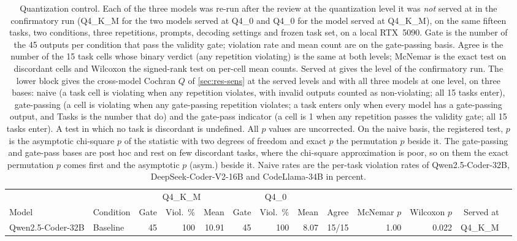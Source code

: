 \begin{table}[t]
\caption{Quantization control. Each of the three models was re-run after the review at
the quantization level it was \emph{not} served at in the confirmatory run (Q4\_K\_M for
the two models served at Q4\_0 and Q4\_0 for the model served at Q4\_K\_M), on the same
fifteen tasks, two conditions, three repetitions, prompts, decoding settings and frozen
task set, on a local RTX~5090. Gate is the number of the 45 outputs per condition that
pass the validity gate; violation rate and mean count are on the gate-passing basis.
Agree is the number of the 15 task cells whose binary verdict (any repetition violating)
is the same at both levels; McNemar is the exact test on discordant cells and Wilcoxon
the signed-rank test on per-cell mean counts. Served at gives the level of the
confirmatory run. The lower block gives the cross-model Cochran $Q$ of \ref{sec:res-sens}
at the served levels and with all three models at one level, on three bases: naive (a
task cell is violating when any repetition violates, with invalid outputs counted as
non-violating; all 15 tasks enter), gate-passing (a cell is violating when any
gate-passing repetition violates; a task enters only when every model has a gate-passing
output, and Tasks is the number that do) and the gate-pass indicator (a cell is 1 when any
repetition passes the validity gate; all 15 tasks enter). A test in which no task is
discordant is undefined. All $p$ values are uncorrected. On the naive basis, the registered test, $p$ is the asymptotic chi-square $p$ of the statistic with two degrees of freedom and exact $p$ the permutation $p$ beside it. The gate-passing and gate-pass bases are post hoc and rest on few discordant tasks, where the chi-square approximation is poor, so on them the exact permutation $p$ comes first and the asymptotic $p$ (asym.) beside it. Naive rates are the per-task violation rates of
Qwen2.5-Coder-32B, DeepSeek-Coder-V2-16B and CodeLlama-34B in percent.}
\label{tab:quant}
\centering
\footnotesize
\setlength{\tabcolsep}{2.7pt}
\begin{tabular}{@{}llrrrrrrrrrrr@{}}
\toprule
 & & \multicolumn{3}{c}{Q4\_K\_M} & \multicolumn{3}{c}{Q4\_0} & & & & & \\
\cmidrule(lr){3-5}\cmidrule(lr){6-8}
Model & Condition & Gate & Viol.\ \% & Mean & Gate & Viol.\ \% & Mean & Agree & McNemar $p$ & Wilcoxon $p$ & Served at & \\
\midrule
Qwen2.5-Coder-32B & Baseline & 45 & 100 & 10.91 & 45 & 100 & 8.07 & 15/15 & 1.00 & 0.022 & Q4\_K\_M & \\

\end{tabular}
\end{table}
